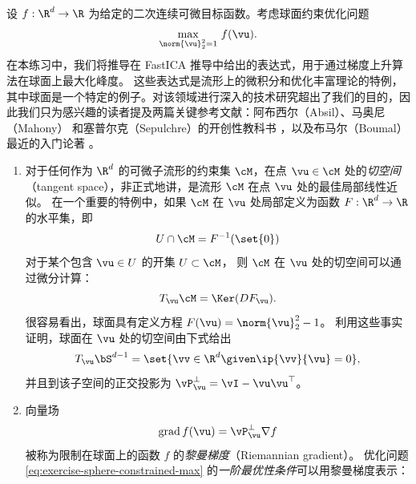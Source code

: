 \documentclass[../../book-main_zh.tex]{subfiles}
\begin{document}
\begin{exercise}\label{exercise:sphere-calculus}
    设 $f : \R^d \to \R$ 为给定的二次连续可微目标函数。考虑球面约束优化问题
    \begin{equation}\label{eq:exercise-sphere-constrained-max}
        \max_{\norm{\vu}_2^2 = 1}\, f(\vu).
    \end{equation}
    在本练习中，我们将推导在 FastICA 推导中给出的表达式，用于通过梯度上升算法在球面上最大化峰度。
    这些表达式是流形上的微积分和优化丰富理论的特例，其中球面是一个特定的例子。对该领域进行深入的技术研究超出了我们的目的，因此我们只为感兴趣的读者提及两篇关键参考文献：阿布西尔（Absil）、马奥尼（Mahony）
    和塞普尔克（Sepulchre）的开创性教科书
    \cite{Absil2009-nc}，以及布马尔（Boumal）最近的入门论著
    \cite{Boumal2023-rj}。
    \begin{enumerate}
        \item 对于任何作为 $\R^d$ 的可微子流形的约束集 $\cM$，在点 $\vu \in \cM$
            处的\textit{切空间}（tangent space），非正式地讲，是流形 $\cM$ 在点 $\vu$ 处的最佳局部线性近似。
            在一个重要的特例中，如果 $\cM$ 在 $\vu$ 处局部定义为函数 $F : \R^d \to \R$ 的水平集，即
            \begin{equation*}
                U \cap \cM = F^{-1}(\set{0})
            \end{equation*}
            对于某个包含 $\vu \in U$ 的开集 $U \subset \cM$，
            则 $\cM$ 在 $\vu$ 处的切空间可以通过微分计算：
            \begin{equation*}
                T_{\vu} \cM = \Ker(DF_{\vu}).
            \end{equation*}
            很容易看出，球面具有定义方程 $F(\vu) = \norm{\vu}_2^2 - 1$。
            利用这些事实证明，球面在 $\vu$ 处的切空间由下式给出
            \begin{equation*}
                T_{\vu} \bS^{d-1} = \set{\vv \in \R^d \given \ip{\vv}{\vu} = 0},
            \end{equation*}
            并且到该子空间的正交投影为
            $\vP_{\vu}^\perp = \vI - \vu\vu^\top$。
        \item 向量场
            \begin{equation}\label{eq:exercise-riemann-grad-sphere}
                \mathrm{grad}\, f(\vu) = \vP_{\vu}^\perp \nabla f
            \end{equation}
            被称为限制在球面上的函数 $f$ 的\textit{黎曼梯度}（Riemannian gradient）。
            优化问题
            \eqref{eq:exercise-sphere-constrained-max}
            的\textit{一阶最优性条件}可以用黎曼梯度表示：

\end{enumerate}
\end{exercise}
\end{document}
